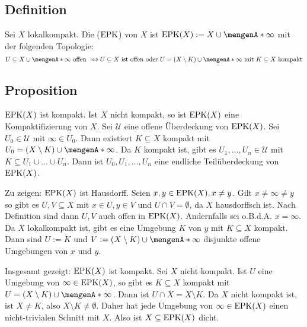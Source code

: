 \subsection[Definition: Einpunktkompaktifizierung ($\EPK$)]{Definition} %
\label{sub:56}
Sei $X$ lokalkompakt. Die  ($\EPK$) von $X$ ist $\EPK(X) := X \cup \set{\infty}$ mit der folgenden Topologie:
\[
	U \subseteq X \cup \set{\infty} \text{ offen } :\Leftrightarrow U \subseteq X \text{ ist offen oder } U= (X \setminus K) \cup \set{\infty} \text{ mit } K \subseteq X \text{ kompakt}  
\] 

\subsection[Proposition über Eigenschaften der Einpunktkompaktifizierung]{Proposition} %
\label{sub:57}
$\operatorname{EPK}(X)$ ist kompakt. Ist $X$ nicht kompakt, so ist $\operatorname{EPK}(X)$ eine Kompaktifizierung von $X$.
Sei $\mathcal{U}$ eine offene Überdeckung von $\operatorname{EPK}(X)$. Sei $U_0 \in \mathcal{U}$ mit $\infty \in U_0$. Dann existiert $K \subseteq X$ kompakt mit 
$U_0 = (X \setminus K) \cup \set{\infty}$. Da $K$ kompakt ist, gibt es $U_1, \ldots , U_n \in \mathcal{U}$ mit $K \subseteq U_1 \cup \ldots \cup U_n$. Dann ist
$U_0, U_1, \ldots , U_n$ eine endliche Teilüberdeckung von $\operatorname{EPK}(X)$.

Zu zeigen: $\operatorname{EPK}(X)$ ist Hausdorff. Seien $x,y \in \operatorname{EPK}(X), x \not= y$. Gilt $x \not= \infty \not= y$ so gibt es $U,V \subseteq X$ mit $x \in U,  y \in V$ und 
$U\cap V = \emptyset$, da $X$ hausdorffsch ist. Nach Definition sind dann $U,V$ auch offen in $\operatorname{EPK}(X)$. Andernfalls sei o.B.d.A. $x = \infty$. Da $X$ lokalkompakt ist, 
gibt es eine Umgebung $K$ von $y$ mit $K \subseteq X$ kompakt. Dann sind $U := \mathring K$ und $V := (X \setminus K) \cup \set{\infty} $ disjunkte offene Umgebungen von 
$x$ und $y$.

Insgesamt gezeigt: $\operatorname{EPK}(X)$ ist kompakt. Sei $X$ nicht kompakt. Ist $U$ eine Umgebung von $\infty \in \operatorname{EPK}(X)$, so gibt es $K \subseteq X$ kompakt mit 
$U = (X \setminus K) \cup \set{\infty}$. Dann ist $U \cap X = X \setminus K$. Da $X$ nicht kompakt ist, ist $X \not= K$, also $X \setminus K  \not= \emptyset$. 
Daher hat jede Umgebung von $\infty \in \operatorname{EPK}(X)$ einen nicht-trivialen Schnitt mit $X$. Also ist $X  \subseteq \operatorname{EPK}(X)$ dicht. \bewende

